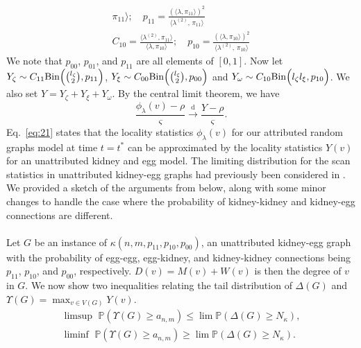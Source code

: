 \documentclass[10pt,journal,compsoc]{IEEEtran}
\theoremstyle{definition}
\begin{document}
\begin{IEEEproof}[Lemma~8]
\begin{gather}
{     \pi_{11}\rangle}; \quad p_{11} = \tfrac{(\langle \lambda, \pi_{11}
     \rangle)^{2}}{\langle \lambda^{(2)},\, \pi_{11} \rangle} \\
 C_{10} = \tfrac{\langle \lambda^{(2)}, \pi_{11} \rangle}{\langle \lambda,
     \pi_{10}\rangle}; \quad p_{10} = \tfrac{(\langle \lambda, \pi_{10}
     \rangle)^{2}}{\langle \lambda^{(2)},\, \pi_{10} \rangle} 
 \end{gather}
 We note that $p_{00}$, $p_{01}$, and $p_{11}$ are all elements of
 $[0,1]$. Now let $Y_{\zeta} \sim C_{11}
 \mathrm{Bin}\Bigl(\tbinom{l_{\zeta}}{2}, p_{11}\Bigr)$, $Y_{\xi} \sim
 C_{00} \mathrm{Bin}\Bigl(\tbinom{l_\xi}{2}, p_{00}\Bigr)$ and
 $Y_{\omega} \sim C_{10} \mathrm{Bin}\Bigl( l_{\zeta} l_{\xi}, p_{10}
 \Bigr)$. We also set $Y = Y_{\zeta} + Y_{\xi} + Y_{\omega}$. By the
 central limit theorem, we have
\begin{equation}
  \label{eq:21}
 \frac{\phi_{\lambda}(v) - \rho}{\varsigma}
 \overset{\mathrm{d}}{\longrightarrow}  \frac{Y - \rho}{\varsigma}.
\end{equation}
Eq.~\eqref{eq:21} states that the locality statistics
$\phi_\lambda(v)$ for our attributed random graphs model at time $t =
t^{*}$ can be approximated by the locality statistics $Y(v)$ for an
unattributed kidney and egg model. The limiting distribution for the
scan statistics in unattributed kidney-egg graphs had previously been
considered in \cite{rukhin:_limit_distr_graph_scan_statis}. We
provided a sketch of the arguments from
\cite{rukhin:_limit_distr_graph_scan_statis} below, along with some
minor changes to handle the case where the probability of
kidney-kidney and
kidney-egg connections are different. \\ \\
\noindent
Let $G$ be an instance of
$\kappa(n,m,p_{11}, p_{10}, p_{00})$, an unattributed kidney-egg graph
with the probability of egg-egg, egg-kidney, and kidney-kidney
connections being $p_{11}$, $p_{10}$, and $p_{00}$,
respectively. $D(v) = M(v) + W(v)$ is then the degree of $v$ in
$G$. We now show two inequalities relating the tail distribution of
$\Delta(G)$ and $\Upsilon(G) = \max_{v \in V(G)} Y(v)$.
\begin{gather}
  \label{eq:27}
    \limsup\,\, \mathbb{P}( \Upsilon(G) \geq a_{n,m} ) \leq \lim
   \mathbb{P}( \Delta(G) \geq N_\kappa), \\
   \label{eq:30}
  \liminf\,\, \mathbb{P}( \Upsilon(G) \geq a_{n,m} ) \geq \lim \mathbb{P}(
  \Delta(G) \geq N_{\kappa}).
\end{gather}

\end{IEEEproof}
\end{document}
